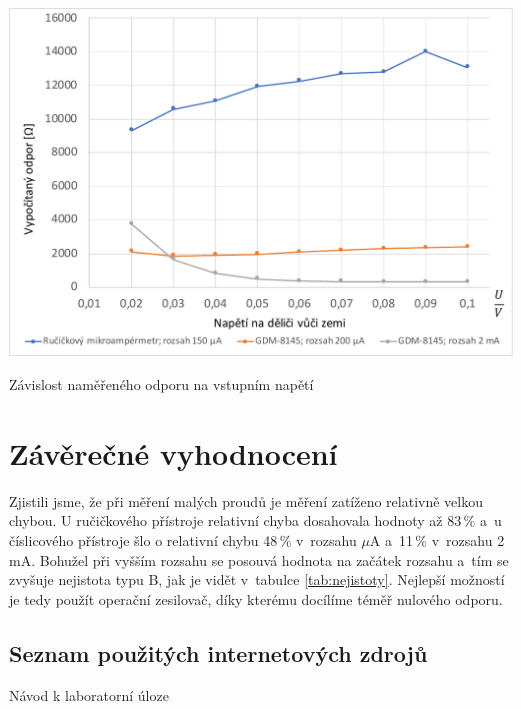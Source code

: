 \documentclass[a4paper,12pt]{article}   %
\newcommand{\tmu}{$\mu$}
\begin{document}
\begin{graf}[h!]
    \centering
    \includegraphics[width=.8\textwidth]{graf_odpor.pdf}
    \caption{Závislost naměřeného odporu na vstupním napětí}
    \label{graf:odpor}
\end{graf}

\section{Závěrečné vyhodnocení}
Zjistili jsme, že při měření malých proudů je měření zatíženo relativně velkou chybou. U ručičkového přístroje relativní chyba dosahovala hodnoty až 83\,\% a~u číslicového přístroje šlo o relativní chybu 48\,\% v~rozsahu \tmu A a~11\,\% v~rozsahu 2\,mA. Bohužel při vyšším rozsahu se posouvá hodnota na začátek rozsahu a~tím se zvyšuje nejistota typu B, jak je vidět v~tabulce \ref{tab:nejistoty}. Nejlepší možností je tedy použít operační zesilovač, díky kterému docílíme téměř nulového odporu.



\clearpage
\renewcommand{\refname}{Seznam použité literatury a~zdrojů informací} 

\begin{thebibliography}{99}

\subsection*{Seznam použitých internetových zdrojů}
     Návod k laboratorní úloze
    
\end{thebibliography}
\end{document}

